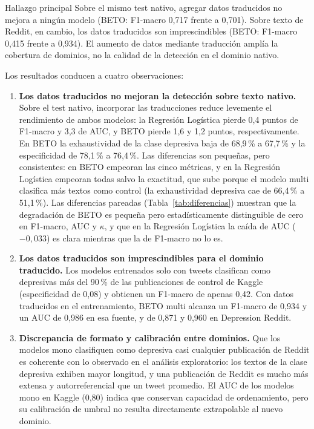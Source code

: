 \documentclass[12pt,a4paper]{article}
\begin{document}
\begin{destacado}{Hallazgo principal}
Sobre el mismo test nativo, agregar datos traducidos no mejora a ningún modelo (BETO: F1-macro 0{,}717 frente a 0{,}701). Sobre texto de Reddit, en cambio, los datos traducidos son imprescindibles (BETO: F1-macro 0{,}415 frente a 0{,}934). El aumento de datos mediante traducción amplía la cobertura de dominios, no la calidad de la detección en el dominio nativo.
\end{destacado}

Los resultados conducen a cuatro observaciones:
\begin{enumerate}[leftmargin=2em]
    \item \textbf{Los datos traducidos no mejoran la detección sobre texto nativo.} Sobre el test nativo, incorporar las traducciones reduce levemente el rendimiento de ambos modelos: la Regresión Logística pierde 0{,}4 puntos de F1-macro y 3{,}3 de AUC, y BETO pierde 1{,}6 y 1{,}2 puntos, respectivamente. En BETO la exhaustividad de la clase depresiva baja de 68{,}9\,\% a 67{,}7\,\% y la especificidad de 78{,}1\,\% a 76{,}4\,\%. Las diferencias son pequeñas, pero consistentes: en BETO empeoran las cinco métricas, y en la Regresión Logística empeoran todas salvo la exactitud, que sube porque el modelo multi clasifica más textos como control (la exhaustividad depresiva cae de 66{,}4\,\% a 51{,}1\,\%). Las diferencias pareadas (Tabla~\ref{tab:diferencias}) muestran que la degradación de BETO es pequeña pero estadísticamente distinguible de cero en F1-macro, AUC y $\kappa$, y que en la Regresión Logística la caída de AUC ($-0{,}033$) es clara mientras que la de F1-macro no lo es.
    \item \textbf{Los datos traducidos son imprescindibles para el dominio traducido.} Los modelos entrenados solo con tweets clasifican como depresivas más del 90\,\% de las publicaciones de control de Kaggle (especificidad de 0{,}08) y obtienen un F1-macro de apenas 0{,}42. Con datos traducidos en el entrenamiento, BETO multi alcanza un F1-macro de 0{,}934 y un AUC de 0{,}986 en esa fuente, y de 0{,}871 y 0{,}960 en Depression Reddit.
    \item \textbf{Discrepancia de formato y calibración entre dominios.} Que los modelos mono clasifiquen como depresiva casi cualquier publicación de Reddit es coherente con lo observado en el análisis exploratorio: los textos de la clase depresiva exhiben mayor longitud, y una publicación de Reddit es mucho más extensa y autorreferencial que un tweet promedio. El AUC de los modelos mono en Kaggle (0{,}80) indica que conservan capacidad de ordenamiento, pero su calibración de umbral no resulta directamente extrapolable al nuevo dominio.

\end{enumerate}
\end{document}
